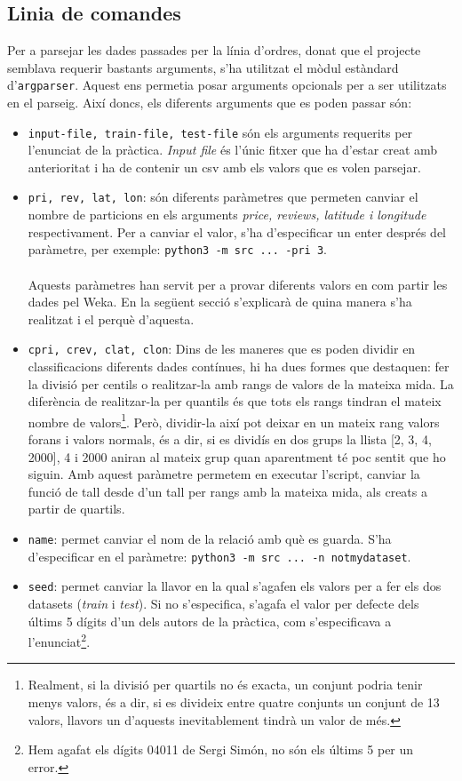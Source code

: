 \subsection{Linia de comandes}
Per a parsejar les dades passades per la línia d'ordres, donat que el projecte semblava
requerir bastants arguments, s'ha utilitzat el mòdul estàndard d'\texttt{argparser}. Aquest
ens permetia posar arguments opcionals per a ser utilitzats en el parseig. Així doncs, els
diferents arguments que es poden passar són:
\begin{itemize}
	\item \texttt{input-file, train-file, test-file} són els arguments requerits per l'enunciat de la pràctica.
		\textit{Input file} és l'únic fitxer que ha d'estar creat amb anterioritat i ha de contenir un 
		csv amb els valors que es volen parsejar. 
	\item \texttt{pri, rev, lat, lon}: són diferents paràmetres que permeten canviar el nombre de particions en els arguments \textit{price, reviews, latitude i longitude} respectivament. Per a
	canviar el valor, s'ha d'especificar un enter després del paràmetre, per exemple:
	\verb|python3 -m src ... -pri 3|.\\
	\\
	Aquests paràmetres han servit per a provar diferents valors en com partir les dades pel Weka.
	En la següent secció s'explicarà de quina manera s'ha realitzat i el perquè d'aquesta.
	\item \texttt{cpri, crev, clat, clon}: Dins de les maneres que es poden dividir en classificacions 
	diferents dades contínues, hi ha dues formes que destaquen: fer la divisió per centils o realitzar-la
	amb rangs de valors de la mateixa mida. La diferència de realitzar-la per quantils és que tots
	els rangs tindran el mateix nombre de valors\footnote{Realment, si la divisió per quartils no
	és exacta, un conjunt podria tenir menys valors, és a dir, si es divideix entre quatre conjunts un
	conjunt de 13 valors, llavors un d'aquests inevitablement tindrà un valor de més.}. Però, dividir-la
	així pot deixar en un mateix rang valors forans i valors normals, és a dir, si es dividís en dos
	grups la llista [2, 3, 4, 2000], 4 i 2000 aniran al mateix grup quan aparentment té poc sentit
	que ho siguin. Amb aquest paràmetre permetem en executar l'script, canviar la funció de tall 
	desde d'un tall per rangs amb la mateixa mida, als creats a partir de quartils.
	\item \texttt{name}: permet canviar el nom de la relació amb què es guarda. S'ha d'especificar
	en el paràmetre: \verb|python3 -m src ... -n notmydataset|.
	\item \texttt{seed}: permet canviar la llavor en la qual s'agafen els valors per a fer els dos
	datasets (\textit{train} i \textit{test}). Si no s'especifica, s'agafa el valor per defecte 
	dels últims 5 dígits d'un dels autors de la pràctica, com s'especificava a l'enunciat\footnote{Hem agafat els dígits 04011 de Sergi Simón, no són els últims 5 per un error.}.
\end{itemize}
